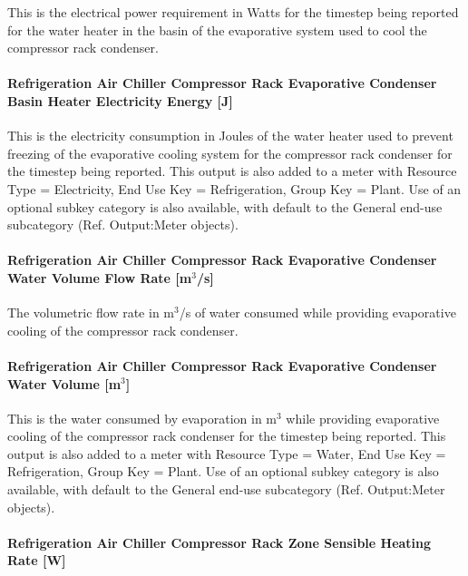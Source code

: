 This is the electrical power requirement in Watts for the timestep being reported for the water heater in the basin of the evaporative system used to cool the compressor rack condenser.

\paragraph{Refrigeration Air Chiller Compressor Rack Evaporative Condenser Basin Heater Electricity Energy {[}J{]}}\label{refrigeration-air-chiller-compressor-rack-evaporative-condenser-basin-heater-electric-energy-j}

This is the electricity consumption in Joules of the water heater used to prevent freezing of the evaporative cooling system for the compressor rack condenser for the timestep being reported. This output is also added to a meter with Resource Type = Electricity, End Use Key = Refrigeration, Group Key = Plant. Use of an optional subkey category is also available, with default to the General end-use subcategory (Ref. Output:Meter objects).

\paragraph{Refrigeration Air Chiller Compressor Rack Evaporative Condenser Water Volume Flow Rate {[}m\(^{3}\)/s{]}}\label{refrigeration-air-chiller-compressor-rack-evaporative-condenser-water-volume-flow-rate-m3s}

The volumetric flow rate in m\(^{3}\)/s of water consumed while providing evaporative cooling of the compressor rack condenser.

\paragraph{Refrigeration Air Chiller Compressor Rack Evaporative Condenser Water Volume {[}m\(^{3}\){]}}\label{refrigeration-air-chiller-compressor-rack-evaporative-condenser-water-volume-m3}

This is the water consumed by evaporation in m\(^{3}\) while providing evaporative cooling of the compressor rack condenser for the timestep being reported. This output is also added to a meter with Resource Type = Water, End Use Key = Refrigeration, Group Key = Plant. Use of an optional subkey category is also available, with default to the General end-use subcategory (Ref. Output:Meter objects).

\paragraph{Refrigeration Air Chiller Compressor Rack Zone Sensible Heating Rate {[}W{]}}\label{refrigeration-air-chiller-compressor-rack-zone-sensible-heating-rate-w}

